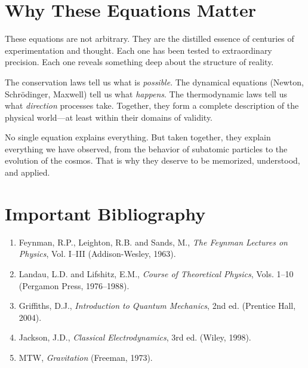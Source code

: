 \section*{Why These Equations Matter}

These equations are not arbitrary. They are the distilled essence of centuries of experimentation and thought. Each one has been tested to extraordinary precision. Each one reveals something deep about the structure of reality.

The conservation laws tell us what is \textit{possible}. The dynamical equations (Newton, Schr\"odinger, Maxwell) tell us what \textit{happens}. The thermodynamic laws tell us what \textit{direction} processes take. Together, they form a complete description of the physical world---at least within their domains of validity.

No single equation explains everything. But taken together, they explain everything we have observed, from the behavior of subatomic particles to the evolution of the cosmos. That is why they deserve to be memorized, understood, and applied.

\section*{Important Bibliography}

\begin{enumerate}
\item Feynman, R.P., Leighton, R.B. and Sands, M., \textit{The Feynman Lectures on Physics}, Vol. I--III (Addison-Wesley, 1963).
\item Landau, L.D. and Lifshitz, E.M., \textit{Course of Theoretical Physics}, Vols. 1--10 (Pergamon Press, 1976--1988).
\item Griffiths, D.J., \textit{Introduction to Quantum Mechanics}, 2nd ed. (Prentice Hall, 2004).
\item Jackson, J.D., \textit{Classical Electrodynamics}, 3rd ed. (Wiley, 1998).
\item MTW, \textit{Gravitation} (Freeman, 1973).
\end{enumerate}
